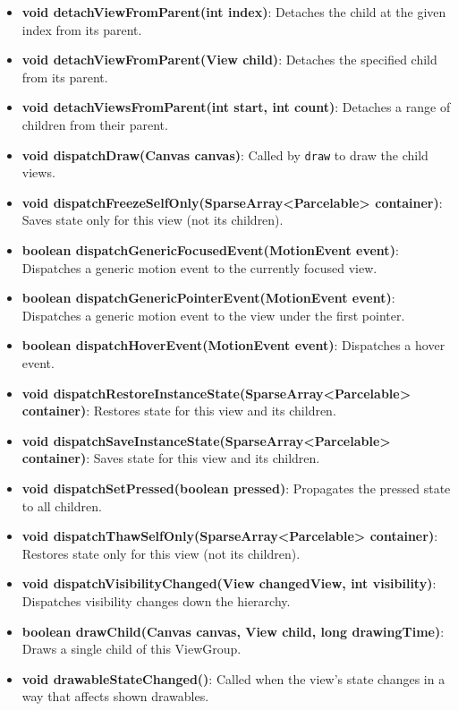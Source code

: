 \documentclass{report}
\begin{document}
\begin{itemize}
\begin{itemize}
                \item \textbf{void detachViewFromParent(int index)}: Detaches the child at the given index from its parent.
                \item \textbf{void detachViewFromParent(View child)}: Detaches the specified child from its parent.
                \item \textbf{void detachViewsFromParent(int start, int count)}: Detaches a range of children from their parent.
                \item \textbf{void dispatchDraw(Canvas canvas)}: Called by \texttt{draw} to draw the child views.
                \item \textbf{void dispatchFreezeSelfOnly(SparseArray<Parcelable> container)}: Saves state only for this view (not its children).
                \item \textbf{boolean dispatchGenericFocusedEvent(MotionEvent event)}: Dispatches a generic motion event to the currently focused view.
                \item \textbf{boolean dispatchGenericPointerEvent(MotionEvent event)}: Dispatches a generic motion event to the view under the first pointer.
                \item \textbf{boolean dispatchHoverEvent(MotionEvent event)}: Dispatches a hover event.
                \item \textbf{void dispatchRestoreInstanceState(SparseArray<Parcelable> container)}: Restores state for this view and its children.
                \item \textbf{void dispatchSaveInstanceState(SparseArray<Parcelable> container)}: Saves state for this view and its children.
                \item \textbf{void dispatchSetPressed(boolean pressed)}: Propagates the pressed state to all children.
                \item \textbf{void dispatchThawSelfOnly(SparseArray<Parcelable> container)}: Restores state only for this view (not its children).
                \item \textbf{void dispatchVisibilityChanged(View changedView, int visibility)}: Dispatches visibility changes down the hierarchy.
                \item \textbf{boolean drawChild(Canvas canvas, View child, long drawingTime)}: Draws a single child of this ViewGroup.
                \item \textbf{void drawableStateChanged()}: Called when the view's state changes in a way that affects shown drawables.

\end{itemize}
\end{itemize}
\end{document}
